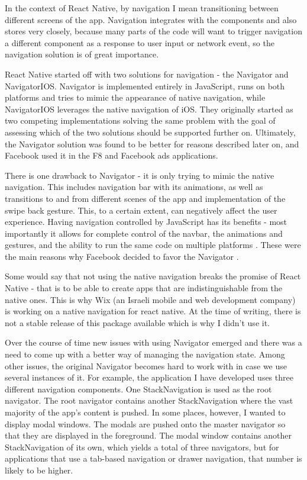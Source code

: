 In the context of React Native, by navigation I mean transitioning between different screens of the app. Navigation integrates with the components and also stores very closely, because many parts of the code will want to trigger navigation a different component as a response to user input or network event, so the navigation solution is of great importance. 

React Native started off with two solutions for navigation - the Navigator and NavigatorIOS. Navigator is implemented entirely in JavaScript, runs on both platforms and tries to mimic the appearance of native navigation, while NavigatorIOS leverages the native navigation of iOS.
They originally started as two competing implementations solving the same problem \cite{rn:navigation}  with the goal of assessing which of the two solutions should be supported further on. Ultimately, the Navigator solution was found to be better for reasons described later on, and Facebook used it in the F8 and Facebook ads applications.


There is one drawback to Navigator - it is only trying to mimic the native navigation. This includes navigation bar with its animations, as well as transitions to and from different scenes of the app and implementation of the swipe back gesture. This, to a certain extent, can negatively affect the user experience.
Having navigation controlled by JavaScript has its benefits - most importantly it allows for complete control of the navbar, the animations and gestures, and the ability to run the same code on multiple platforms \cite{rn:navigation}. These were the main reasons why Facebook decided to favor the Navigator \cite{rn:navigation}.

Some would say that not using the native navigation breaks the promise of React Native - that is to be able to create apps that are indistinguishable from the native ones. This is why Wix (an Israeli mobile and web development company) is working on a native navigation for react native. At the time of writing, there is not a stable release of this package available which is why I didn't use it.

Over the course of time new issues with using Navigator emerged and there was a need to come up with a better way of managing the navigation state. Among other issues, the original Navigator becomes hard to work with in case we use several instances of it. For example, the application I have developed uses three different navigation components. One StackNavigation is used as the root navigator. The root navigator contains another StackNavigation where the vast majority of the app's content is pushed. In some places, however, I wanted to display modal windows. The modals are pushed onto the master navigator so that they are displayed in the foreground. The modal window contains another StackNavigation of its own, which yields a total of three navigators, but for applications that use a tab-based navigation or drawer navigation, that number is likely to be higher. 


